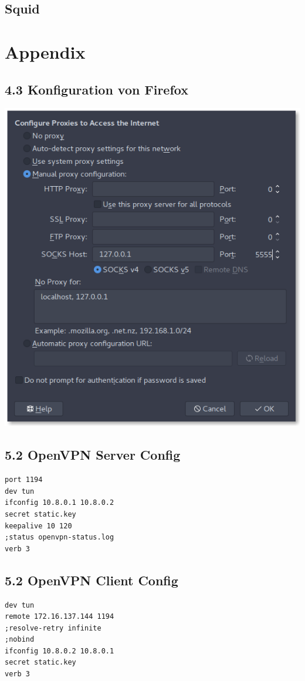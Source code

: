 \documentclass[10pt,a4paper]{article}
\begin{document}
\subsection{Squid}



\newpage
\section*{Appendix}
\subsection*{4.3 Konfiguration von Firefox}
\includegraphics[width=\textwidth]{images/image.png}

\subsection*{5.2 OpenVPN Server Config}
\begin{verbatim}
port 1194
dev tun
ifconfig 10.8.0.1 10.8.0.2
secret static.key
keepalive 10 120
;status openvpn-status.log
verb 3
\end{verbatim}
\subsection*{5.2 OpenVPN Client Config}
\begin{verbatim}
dev tun
remote 172.16.137.144 1194
;resolve-retry infinite
;nobind
ifconfig 10.8.0.2 10.8.0.1
secret static.key
verb 3
\end{verbatim}
\end{document}
